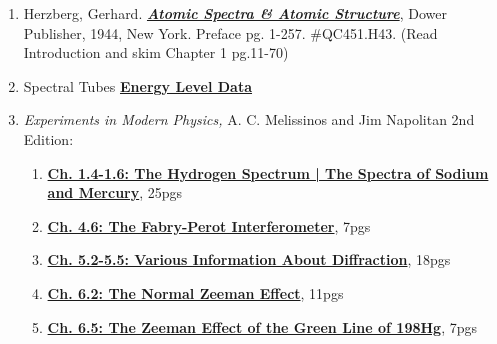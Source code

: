 \documentclass{../lab}
\begin{document}
\begin{enumerate}
    \item Herzberg, Gerhard. \emph{\href{http://physics111.lib.berkeley.edu/Physics111/Reprints/ATM/02-2ndEd-Atomic\_Spectra\_and\_Atomic\_Structure.pdf}{\textbf{Atomic Spectra \& Atomic Structure}}}, Dower Publisher, 1944, New York. Preface pg. 1-257. \#QC451.H43. (Read Introduction and skim Chapter 1 pg.11-70)

    \item Spectral Tubes \href{http://physics111.lib.berkeley.edu/Physics111/Reprints/ATM/ATM\_index.html}{\textbf{Energy Level Data}}

    \item\emph{Experiments in Modern Physics,} A. C. Melissinos and Jim Napolitan 2nd Edition:
    
    \begin{enumerate}
        \item \href{http://physics111.lib.berkeley.edu/Physics111/Reprints/ATM/Melissinos\_2nd\_2003/ATM\%20OCR\%20melissinos\%202003\%20chapter\%201.4-1.6.pdf}{\textbf{Ch. 1.4-1.6: The Hydrogen Spectrum | The Spectra of Sodium and Mercury}}, 25pgs
    
        \item \href{http://physics111.lib.berkeley.edu/Physics111/Reprints/ATM/Melissinos\_2nd\_2003/ATM\%20OCR\%20melissinos\%202003\%20chapter\%204.6.pdf}{\textbf{Ch. 4.6: The Fabry-Perot Interferometer}}, 7pgs
    
        \item \href{http://physics111.lib.berkeley.edu/Physics111/Reprints/ATM/Melissinos\_2nd\_2003/ATM\%20OCR\%20melissinos\%202003\%20chapter\%205.2-5.5.pdf}{\textbf{Ch. 5.2-5.5: Various Information About Diffraction}}, 18pgs
    
        \item \href{http://physics111.lib.berkeley.edu/Physics111/Reprints/ATM/Melissinos\_2nd\_2003/ATM\%20OCR\%20melissinos\%202003\%20chapter\%206.2.pdf}{\textbf{Ch. 6.2: The Normal Zeeman Effect}}, 11pgs
    
        \item \href{http://physics111.lib.berkeley.edu/Physics111/Reprints/ATM/Melissinos\_2nd\_2003/ATM\%20OCR\%20melissinos\%202003\%20chapter\%206.5.pdf}{\textbf{Ch. 6.5: The Zeeman Effect of the Green Line of 198Hg}}, 7pgs
    
    \end{enumerate}

\end{enumerate}
\end{document}
